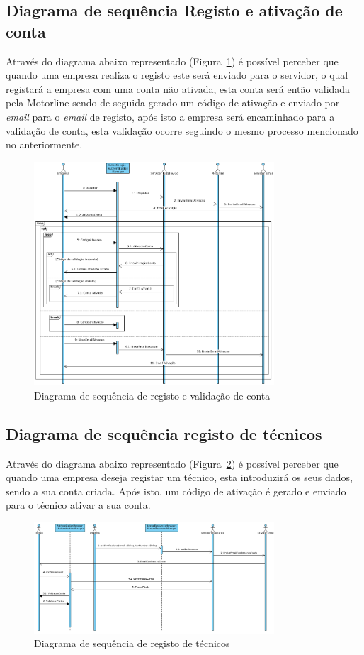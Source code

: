 \newpage

\subsection{Diagrama de sequência Registo e ativação de conta}

Através do diagrama abaixo representado (Figura~\ref{fig:44}) é possível perceber que quando uma
empresa realiza o registo este será enviado para o servidor, o qual registará a empresa com uma 
conta não ativada, esta conta será então validada pela Motorline sendo de seguida
gerado um código de ativação e enviado por \textit{email} para o 
\textit{email} de registo, após isto a empresa será encaminhado para a validação de conta, esta validação 
ocorre seguindo o mesmo processo mencionado no anteriormente.


\begin{figure}[htb]
    \centering
    \includegraphics[width=0.8\textwidth]{images/diagramas/sequencia/diagrama_registo.png}
    \caption{Diagrama de sequência de registo e validação de conta}
    \label{fig:44}
\end{figure}

\newpage

\subsection{Diagrama de sequência registo de técnicos}

Através do diagrama abaixo representado (Figura~\ref{fig:45}) é possível perceber que quando uma
empresa deseja registar um técnico, esta introduzirá os seus dados, sendo a sua conta criada. Após isto, 
um código de ativação é gerado e enviado para o técnico ativar a sua conta.

\begin{figure}[htb]
    \centering
    \includegraphics[width=0.8\textwidth]{images/diagramas/sequencia/registo_tecnico.png}
    \caption{Diagrama de sequência de registo de técnicos}
    \label{fig:45}
\end{figure}